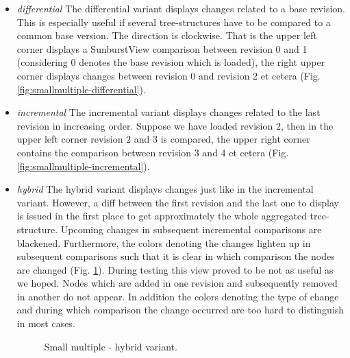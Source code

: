 \begin{itemize}
\item \emph{differential} The differential variant displays changes related to a base revision. This is especially useful if several tree-structures have to be compared to a common base version. The direction is clockwise. That is the upper left corner displays a SunburstView comparison between revision 0 and 1 (considering 0 denotes the base revision which is loaded), the right upper corner displays changes between revision 0 and revision 2 et cetera (Fig. \ref{fig:smallmultiple-differential}).

\item \emph{incremental} The incremental variant displays changes related to the last revision in increasing order. Suppose we have loaded revision 2, then in the upper left corner revision 2 and 3 is compared, the upper right corner contains the comparison between revision 3 and 4 et cetera (Fig. \ref{fig:smallmultiple-incremental}).

\item \emph{hybrid} The hybrid variant displays changes just like in the incremental variant. However, a diff between the first revision and the last one to display is issued in the first place to get approximately the whole aggregated tree-structure. Upcoming changes in subsequent incremental comparisons are blackened. Furthermore, the colors denoting the changes lighten up in subsequent comparisons such that it is clear in which comparison the nodes are changed (Fig. \ref{fig:wikipedia-smallmultiples-hybrid}). During testing this view proved to be not as useful as we hoped. Nodes which are added in one revision and subsequently removed in another do not appear. In addition the colors denoting the type of change and during which comparison the change occurred are too hard to distinguish in most cases.

\begin{figure}[tb]
\caption{\label{fig:wikipedia-smallmultiples-hybrid} Small multiple - hybrid variant.}
\end{figure}
\end{itemize}

